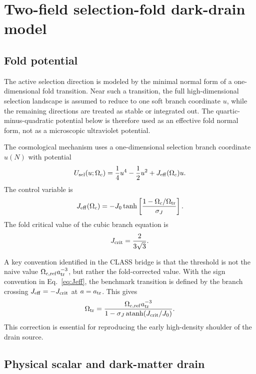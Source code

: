 ﻿\documentclass[11pt,prd,preprint,nofootinbib,amsmath,amssymb]{revtex4-2}
\begin{document}
\section{Two-field selection-fold dark-drain model}
\label{sec:model}

\subsection{Fold potential}

The active selection direction is modeled by the minimal normal form of a
one-dimensional fold transition. Near such a transition, the full
high-dimensional selection landscape is assumed to reduce to one soft branch
coordinate $u$, while the remaining directions are treated as stable or
integrated out. The quartic-minus-quadratic potential below is therefore used
as an effective fold normal form, not as a microscopic ultraviolet potential.

The cosmological mechanism uses a one-dimensional selection branch coordinate $u(N)$ with potential
\begin{equation}
U_{\rm sel}(u;\Omega_c)
=
\frac14u^4-\frac12u^2+J_{\rm eff}(\Omega_c)u.
\label{eq:usel_fold}
\end{equation}
The control variable is
\begin{equation}
J_{\rm eff}(\Omega_c)
=
-J_0\tanh\left[
\frac{1-\Omega_c/\Omega_{\rm tr}}{\sigma_J}
\right].
\label{eq:Jeff}
\end{equation}
The fold critical value of the cubic branch equation is
\begin{equation}
J_{\rm crit}=\frac{2}{3\sqrt3}.
\end{equation}

A key convention identified in the CLASS bridge is that the threshold is not
the naive value $\Omega_{c,\rm ref}a_{\rm tr}^{-3}$, but rather the
fold-corrected value. With the sign convention in Eq.~\eqref{eq:Jeff}, the
benchmark transition is defined by the branch crossing
$J_{\rm eff}=-J_{\rm crit}$ at $a=a_{\rm tr}$. This gives
\begin{equation}
\Omega_{\rm tr}
=
\frac{
\Omega_{c,\rm ref}a_{\rm tr}^{-3}
}{
1-\sigma_J\operatorname{atanh}(J_{\rm crit}/J_0)
}.
\label{eq:fold_corrected_threshold}
\end{equation}
This correction is essential for reproducing the early high-density shoulder of the drain source.

\subsection{Physical scalar and dark-matter drain}
\end{document}
